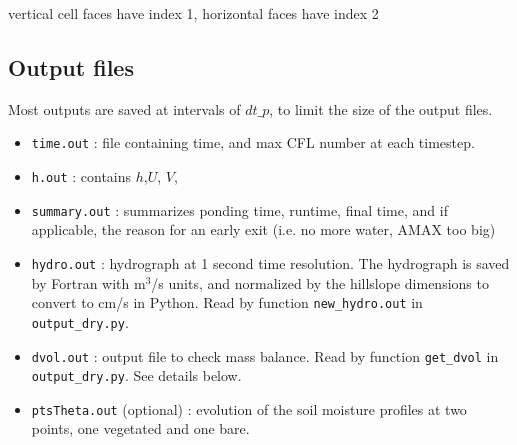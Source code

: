 \documentclass{article}
\newcommand{\code}[1]{\texttt{#1}}
\begin{document}
%
%


vertical cell faces have index 1,
horizontal faces have index 2


\subsection{Output files}
 Most outputs are saved at intervals of  $dt\_p$, to limit the size of the output files.

\begin{itemize}
	\item \code{time.out} : file containing time, and max CFL number at each timestep.
	\item \code{h.out} : contains $h$,$U$, $V$,
	\item \code{summary.out} : summarizes ponding time, runtime, final time, and if applicable, the reason for an early exit (i.e. no more water, AMAX too big) 
	\item \code{hydro.out} : hydrograph at 1 second time resolution.  The hydrograph is saved by Fortran with m$^3$/s units,  and normalized by the hillslope dimensions to convert to cm/s in Python. Read by function \code{new\_hydro.out} in \code{output\_dry.py}.
	\item \code{dvol.out} :  output file to check mass balance. Read by function \code{get\_dvol} in \code{output\_dry.py}. See details below.

	\item \code{ptsTheta.out} (optional) : evolution of the soil moisture profiles at two points, one vegetated and one bare. 
\end{itemize}


%
%
%
%
%
%
%
\end{document}
